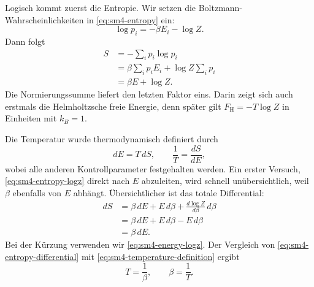 Logisch kommt zuerst die Entropie. Wir setzen die Boltzmann-Wahrscheinlichkeiten in \eqref{eq:sm4-entropy} ein:
\begin{equation}
 \log p_i=-\beta E_i-\log Z.
\end{equation}
Dann folgt
\begin{align}
 S
 &=-\sum_i p_i\log p_i\\
 &=\beta\sum_i p_iE_i+\log Z\sum_i p_i\\
 &=\beta E+\log Z.
 \label{eq:sm4-entropy-logz}
\end{align}
Die Normierungssumme liefert den letzten Faktor eins. Darin zeigt sich auch erstmals die Helmholtzsche freie Energie, denn später gilt \(F_{\mathrm H}=-T\log Z\) in Einheiten mit \(k_B=1\).

\begin{classroomqa}
\end{classroomqa}

\begin{classroomqa}
\end{classroomqa}

Die Temperatur wurde thermodynamisch definiert durch
\begin{equation}
 dE=T\,dS,
 \qquad
 \frac{1}{T}=\frac{dS}{dE},
 \label{eq:sm4-temperature-definition}
\end{equation}
wobei alle anderen Kontrollparameter festgehalten werden. Ein erster Versuch, \eqref{eq:sm4-entropy-logz} direkt nach \(E\) abzuleiten, wird schnell unübersichtlich, weil \(\beta\) ebenfalls von \(E\) abhängt. Übersichtlicher ist das totale Differential:
\begin{align}
 dS
 &=\beta\,dE+E\,d\beta
   +\frac{d\log Z}{d\beta}\,d\beta\\
 &=\beta\,dE+E\,d\beta-E\,d\beta\\
 &=\beta\,dE.
 \label{eq:sm4-entropy-differential}
\end{align}
Bei der Kürzung verwenden wir \eqref{eq:sm4-energy-logz}. Der Vergleich von \eqref{eq:sm4-entropy-differential} mit \eqref{eq:sm4-temperature-definition} ergibt
\begin{equation}
 T=\frac{1}{\beta},
 \qquad
 \beta=\frac{1}{T}.
 \label{eq:sm4-beta-temperature}
\end{equation}

